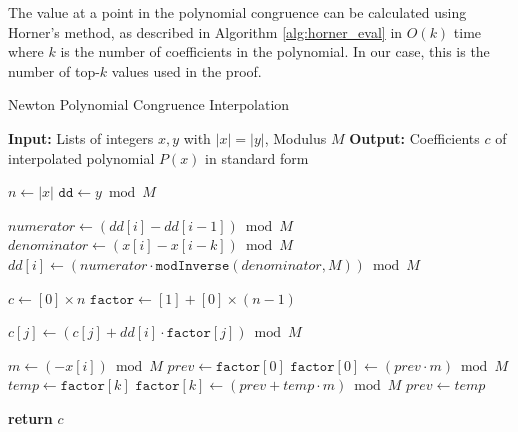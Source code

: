 \documentclass{article}
\theoremstyle{plain}
\theoremstyle{definition}
\theoremstyle{remark}
\begin{document}
The value at a point in the polynomial congruence can be calculated using Horner's method, as described in Algorithm \ref{alg:horner_eval} in $O(k)$ time where $k$ is the number of coefficients in the polynomial.
In our case, this is the number of top-$k$ values used in the proof.

\begin{algorithm}[h]
    \caption{Newton Polynomial Congruence Interpolation}
    \label{alg:newton_mod_poly}
\begin{algorithmic}[1]
    \STATE \textbf{Input:} Lists of integers $x, y$ with $|x| = |y|$, Modulus $M$
    \STATE \textbf{Output:} Coefficients $c$ of interpolated polynomial $P(x)$ in standard form

    \STATE $n \gets |x|$
    \STATE $\texttt{dd} \gets y \bmod M$ 

            \STATE $numerator \gets (dd[i] - dd[i-1]) \bmod M$
            \STATE $denominator \gets (x[i] - x[i-k]) \bmod M$
            \STATE $dd[i] \gets (numerator \cdot \texttt{modInverse}(denominator, M)) \bmod M$
        \ENDFOR
    \ENDFOR

    \STATE $c \gets [0] \times n$ 
    \STATE $\texttt{factor} \gets [1] + [0] \times (n-1)$ 

            \STATE $c[j] \gets (c[j] + dd[i] \cdot \texttt{factor}[j]) \bmod M$
        \ENDFOR

            \STATE $m \gets (-x[i]) \bmod M$
            \STATE $prev \gets \texttt{factor}[0]$
            \STATE $\texttt{factor}[0] \gets (prev \cdot m) \bmod M$
                \STATE $temp \gets \texttt{factor}[k]$
                \STATE $\texttt{factor}[k] \gets (prev + temp \cdot m) \bmod M$
                \STATE $prev \gets temp$
            \ENDFOR
        \ENDIF
    \ENDFOR

    \STATE \textbf{return} $c$
\end{algorithmic}
\end{algorithm}
\end{document}
